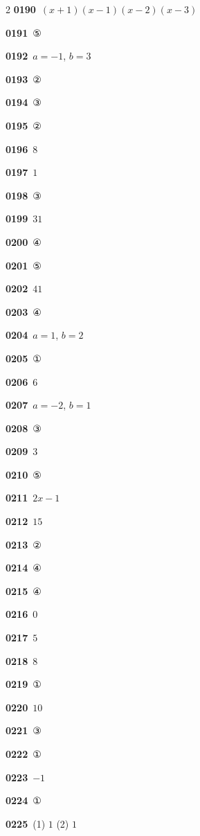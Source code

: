 \documentclass[10pt,a4paper]{article}
\begin{document}
\begin{multicols}{2}
\noindent\textbf{0190}\ $(x+1)(x-1)(x-2)(x-3)$\par
\noindent\textbf{0191}\ ⑤\par
\noindent\textbf{0192}\ $a=-1$, $b=3$\par
\noindent\textbf{0193}\ ②\par
\noindent\textbf{0194}\ ③\par
\noindent\textbf{0195}\ ②\par
\noindent\textbf{0196}\ $8$\par
\noindent\textbf{0197}\ $1$\par
\noindent\textbf{0198}\ ③\par
\noindent\textbf{0199}\ $31$\par
\noindent\textbf{0200}\ ④\par
\noindent\textbf{0201}\ ⑤\par
\noindent\textbf{0202}\ $41$\par
\noindent\textbf{0203}\ ④\par
\noindent\textbf{0204}\ $a=1$, $b=2$\par
\noindent\textbf{0205}\ ①\par
\noindent\textbf{0206}\ $6$\par
\noindent\textbf{0207}\ $a=-2$, $b=1$\par
\noindent\textbf{0208}\ ③\par
\noindent\textbf{0209}\ $3$\par
\noindent\textbf{0210}\ ⑤\par
\noindent\textbf{0211}\ $2x-1$\par
\noindent\textbf{0212}\ $15$\par
\noindent\textbf{0213}\ ②\par
\noindent\textbf{0214}\ ④\par
\noindent\textbf{0215}\ ④\par
\noindent\textbf{0216}\ $0$\par
\noindent\textbf{0217}\ $5$\par
\noindent\textbf{0218}\ $8$\par
\noindent\textbf{0219}\ ①\par
\noindent\textbf{0220}\ $10$\par
\noindent\textbf{0221}\ ③\par
\noindent\textbf{0222}\ ①\par
\noindent\textbf{0223}\ $-1$\par
\noindent\textbf{0224}\ ①\par
\noindent\textbf{0225}\ (1) $1$ (2) $1$\par

\end{multicols}
\end{document}
